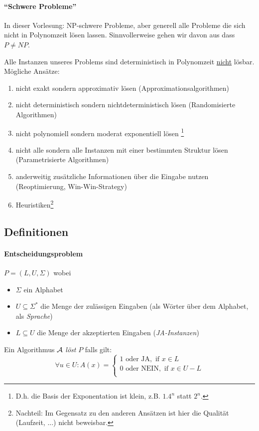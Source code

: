 \paragraph{``Schwere Probleme''}
In dieser Vorlesung: NP-schwere Probleme, aber generell alle Probleme die sich nicht in Polynomzeit lösen lassen.
Sinnvollerweise gehen wir davon aus dass $P \neq NP$.

Alle Instanzen unseres Problems sind deterministisch in Polynomzeit \underline{nicht} lösbar.
Mögliche Ansätze:
\begin{enumerate}[label=\alph*)]
    \item nicht exakt sondern approximativ lösen (Approximationsalgorithmen)
    \item nicht deterministisch sondern nichtdeterministisch lösen (Randomisierte Algorithmen)
    \item nicht polynomiell sondern moderat exponentiell lösen%
    \footnote{D.h. die Basis der Exponentation ist klein, z.B. $1.4^n$ statt $2^n$.}
    \item nicht alle sondern alle Instanzen mit einer bestimmten Struktur lösen (Parametrisierte Algorithmen)
    \item anderweitig zusätzliche Informationen über die Eingabe nutzen (Reoptimierung, Win-Win-Strategy)
    \item Heuristiken\footnote{Nachteil: Im Gegensatz zu den anderen Ansätzen ist hier die Qualität (Laufzeit, ...) nicht beweisbar.}
\end{enumerate}


\subsection{Definitionen}

\paragraph{Entscheidungsproblem}
$P = (L, U, \Sigma)$ wobei
\begin{itemize}
    \item $\Sigma$ ein Alphabet
    \item $U \subseteq \Sigma^*$ die Menge der zulässigen Eingaben (als Wörter über dem Alphabet, als \emph{Sprache})
    \item $L \subseteq U$ die Menge der akzeptierten Eingaben (\emph{JA-Instanzen})
\end{itemize}
Ein Algorithmus $\mathcal{A}$ \emph{löst} $P$ falls gilt:
$$ \forall u \in U : A(x) =
\begin{cases}
1 \text{ oder JA}, \text{ if } x \in L \\
0 \text{ oder NEIN}, \text{ if } x \in U-L \\
\end{cases}
$$

